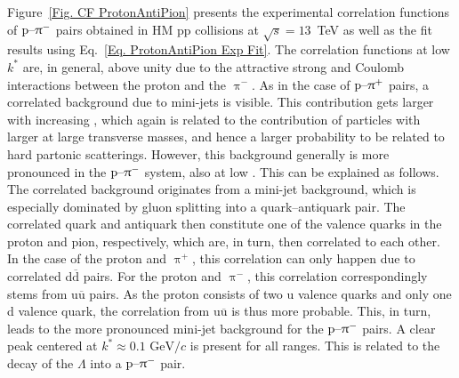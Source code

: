 \documentclass[ALICE,manyauthors]{cernphprep}
\begin{document}
Figure~\ref{Fig. CF ProtonAntiPion} presents the experimental correlation functions of $\text{p--}\uppi^-$ pairs obtained in HM pp collisions at $\sqrt{s} = 13$~TeV as well as the fit results using Eq.~\eqref{Eq. ProtonAntiPion Exp Fit}. The correlation functions at low $k^*$ are, in general, above unity due to the attractive strong and Coulomb interactions between the proton and the $\uppi^-$. As in the case of $\text{p--}\uppi^+$ pairs, a correlated background due to mini-jets is visible. This contribution gets larger with increasing \mtText, which again is related to the contribution of particles with larger \ptText{} at large transverse masses, and hence a larger probability to be related to hard partonic scatterings. However, this background generally is more pronounced in the $\text{p--}\uppi^-$ system, also at low \mtText. This can be explained as follows. The correlated background originates from a mini-jet background, which is especially dominated by gluon splitting into a quark--antiquark pair. The correlated quark and antiquark then constitute one of the valence quarks in the proton and pion, respectively, which are, in turn, then correlated to each other. In the case of the proton and $\uppi^+$, this correlation can only happen due to correlated d$\overline{\text{d}}$ pairs. For the  proton and $\uppi^-$, this correlation correspondingly stems from u$\overline{\text{u}}$ pairs. As the proton consists of two u valence quarks and only one d valence quark, the correlation from u$\overline{\text{u}}$ is thus more probable. This, in turn, leads to the more pronounced mini-jet background for the $\text{p--}\uppi^-$ pairs. A clear peak centered at $k^*\approx 0.1 \text{ GeV}/c$ is present for all \mtText{} ranges. This is related to the decay of the $\Lambda$ into a $\text{p--}\uppi^-$ pair.
\end{document}

